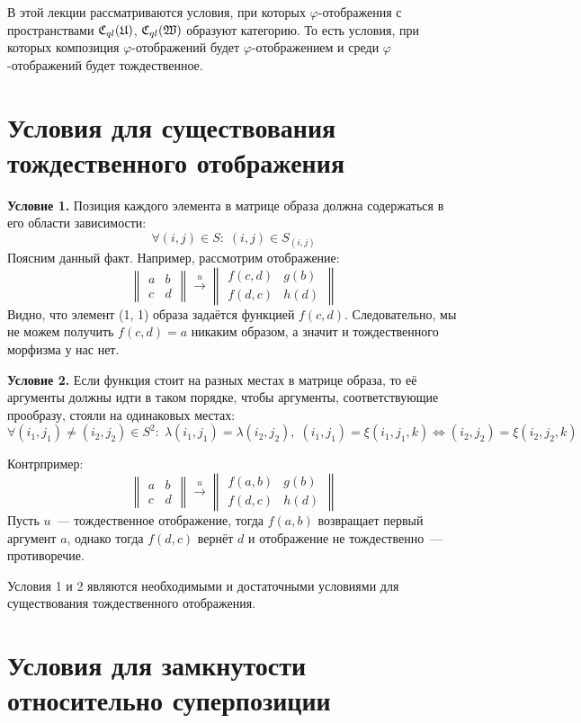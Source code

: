 \documentclass[a4paper, 12pt]{report}
\begin{document}
В этой лекции рассматриваются условия, при которых $\varphi$-отображения с пространствами $\mathfrak{C}_{ql}(\mathfrak{U})$, $\mathfrak{C}_{ql}(\mathfrak{W})$ образуют категорию. То есть условия, при которых композиция $\varphi$-отображений будет $\varphi$-отображением и среди $\varphi$-отображений будет тождественное.

\section{Условия для существования тождественного отображения}

\textbf{Условие 1.} Позиция каждого элемента в матрице образа должна содержаться в его области зависимости:
\[
\forall (i, j) \in S: \; (i, j) \in S_{(i,j)}
\]
Поясним данный факт. Например, рассмотрим отображение:
\[
\begin{Vmatrix}
a & b\\
c & d
\end{Vmatrix}
\mathop{\rightarrow}\limits^u
\begin{Vmatrix}
f(c,d) & g(b)\\
f(d,c) & h(d)
\end{Vmatrix}
\]
Видно, что элемент (1, 1) образа задаётся функцией $f(c, d)$. Следовательно, мы не можем получить $f(c, d) = a$ никаким образом, а значит и тождественного морфизма у нас нет.

\textbf{Условие 2.} Если функция стоит на разных местах в матрице образа, то её аргументы должны идти в таком порядке, чтобы аргументы, соответствующие прообразу, стояли на одинаковых местах:
\[
\forall (i_1, j_1) \neq (i_2, j_2) \in S^2: \; \lambda(i_1, j_1) = \lambda(i_2, j_2), \; (i_1, j_1) = \xi(i_1, j_1, k) \Leftrightarrow (i_2, j_2) = \xi(i_2, j_2, k)
\]

Контрпример:\\
\[
\begin{Vmatrix}
a & b\\
c & d
\end{Vmatrix}
\mathop{\rightarrow}\limits^u
\begin{Vmatrix}
f(a,b) & g(b)\\
f(d,c) & h(d)
\end{Vmatrix}
\]
Пусть $u$~--- тождественное отображение, тогда $f(a,b)$ возвращает первый аргумент $a$, однако тогда $f(d,c)$ вернёт $d$ и отображение не тождественно~--- противоречие.

Условия 1 и 2 являются необходимыми и достаточными условиями для существования тождественного отображения.

\section{Условия для замкнутости относительно суперпозиции}
\end{document}
